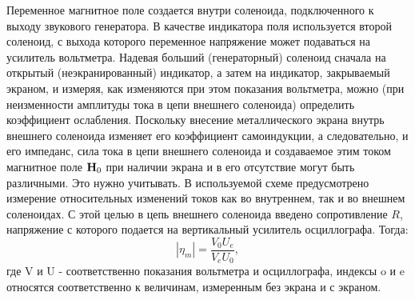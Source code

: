 Переменное магнитное поле создается внутри соленоида, подключенного к выходу звукового генератора. В качестве индикатора
поля используется второй соленоид, с выхода которого переменное напряжение может подаваться на усилитель вольтметра.
Надевая больший (генераторный) соленоид сначала на открытый (неэкранированный) индикатор, а затем на индикатор,
закрываемый экраном, и измеряя, как изменяются при этом показания вольтметра, можно (при неизменности амплитуды тока в
цепи внешнего соленоида) определить коэффициент ослабления. Поскольку внесение металлического экрана внутрь внешнего
соленоида изменяет его коэффициент самоиндукции, а следовательно, и его импеданс, сила тока в цепи внешнего соленоида и
создаваемое этим током магнитное поле $\textbf{H}_0$ при наличии экрана и в его отсутствие могут быть различными. Это нужно
учитывать. В используемой схеме предусмотрено измерение относительных изменений токов как во внутреннем, так и во
внешнем соленоидах. С этой целью в цепь внешнего соленоида введено сопротивление $R$, напряжение с которого подается на
вертикальный усилитель осциллографа. Тогда:
\begin{equation}
 	|\eta_m|=\frac{V_0U_e}{V_eU_0},
	\label{eq:7}
\end{equation}
где V и U - соответственно показания вольтметра и осциллографа, индексы o и e относятся соответственно к величинам, измеренным без экрана и с экраном. 





